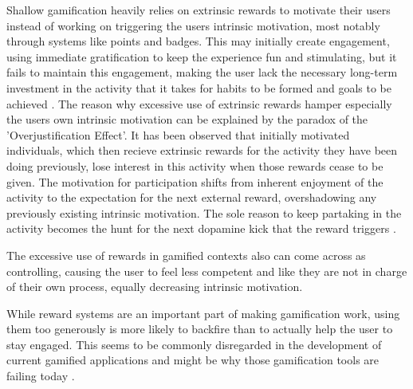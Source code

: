 Shallow gamification heavily relies on extrinsic rewards to motivate their users instead of working on triggering the users intrinsic motivation, most notably through systems like points and badges. This may initially create engagement, using immediate gratification to keep the experience fun and stimulating, but it fails to maintain this engagement, making the user lack the necessary long-term investment in the activity that it takes for habits to be formed and goals to be achieved \cite{equilibrium}.
The reason why excessive use of extrinsic rewards hamper especially the users own intrinsic motivation can be explained by the paradox of the 'Overjustification Effect'. It has been observed that initially motivated individuals, which then recieve extrinsic rewards for the activity they have been doing previously, lose interest in this activity when those rewards cease to be given. The motivation for participation shifts from inherent enjoyment of the activity to the expectation for the next external reward, overshadowing any previously existing intrinsic motivation. The sole reason to keep partaking in the activity becomes the hunt for the next dopamine kick that the reward triggers \cite{equilibrium}.

The excessive use of rewards in gamified contexts also can come across as controlling, causing the user to feel less competent and like they are not in charge of their own process, equally decreasing intrinsic motivation.

While reward systems are an important part of making gamification work, using them too generously is more likely to backfire than to actually help the user to stay engaged. This seems to be commonly disregarded in the development of current gamified applications and might be why those gamification tools are failing today \cite{equilibrium}.